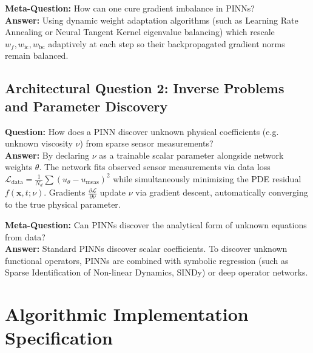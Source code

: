 \documentclass[11pt,a4paper]{article}
\theoremstyle{definition}
\begin{document}
\textbf{Meta-Question:} How can one cure gradient imbalance in PINNs?\\
\textbf{Answer:} Using dynamic weight adaptation algorithms (such as Learning Rate Annealing or Neural Tangent Kernel eigenvalue balancing) which rescale $w_f, w_{\text{ic}}, w_{\text{bc}}$ adaptively at each step so their backpropagated gradient norms remain balanced.

\subsection{Architectural Question 2: Inverse Problems and Parameter Discovery}
\textbf{Question:} How does a PINN discover unknown physical coefficients (e.g. unknown viscosity $\nu$) from sparse sensor measurements?\\
\textbf{Answer:} By declaring $\nu$ as a trainable scalar parameter alongside network weights $\theta$. The network fits observed sensor measurements via data loss $\mathcal{L}_{\text{data}} = \frac{1}{N_d}\sum (u_\theta - u_{\text{meas}})^2$ while simultaneously minimizing the PDE residual $f(\mathbf{x}, t; \nu)$. Gradients $\frac{\partial \mathcal{L}}{\partial \nu}$ update $\nu$ via gradient descent, automatically converging to the true physical parameter.

\textbf{Meta-Question:} Can PINNs discover the analytical form of unknown equations from data?\\
\textbf{Answer:} Standard PINNs discover scalar coefficients. To discover unknown functional operators, PINNs are combined with symbolic regression (such as Sparse Identification of Non-linear Dynamics, SINDy) or deep operator networks.

\section{Algorithmic Implementation Specification}
\end{document}
